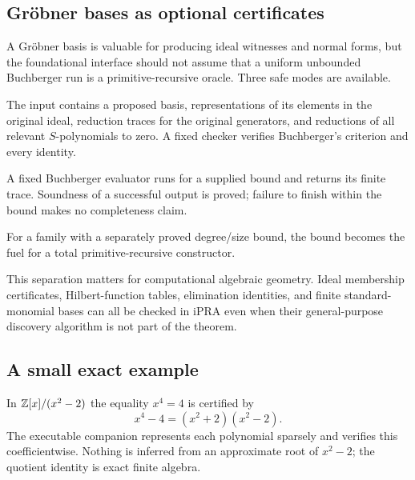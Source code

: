 \subsection{Gröbner bases as optional certificates}

A Gröbner basis is valuable for producing ideal witnesses and normal forms, but the foundational
interface should not assume that a uniform unbounded Buchberger run is a primitive-recursive
oracle.  Three safe modes are available.

\begin{description}[style=nextline]
\item[Verification mode.]
The input contains a proposed basis, representations of its elements in the original ideal,
reduction traces for the original generators, and reductions of all relevant $S$-polynomials to
zero.  A fixed checker verifies Buchberger's criterion and every identity.

\item[Fuelled mode.]
A fixed Buchberger evaluator runs for a supplied bound and returns its finite trace.  Soundness of a
successful output is proved; failure to finish within the bound makes no completeness claim.

\item[Bounded-family mode.]
For a family with a separately proved degree/size bound, the bound becomes the fuel for a total
primitive-recursive constructor.
\end{description}

This separation matters for computational algebraic geometry.  Ideal membership certificates,
Hilbert-function tables, elimination identities, and finite standard-monomial bases can all be
checked in iPRA even when their general-purpose discovery algorithm is not part of the theorem.

\subsection{A small exact example}

In $\mathbb Z[x]/(x^2-2)$ the equality $x^4=4$ is certified by
\[
 x^4-4=(x^2+2)(x^2-2).
\]
The executable companion represents each polynomial sparsely and verifies this coefficientwise.
Nothing is inferred from an approximate root of $x^2-2$; the quotient identity is exact finite
algebra.
